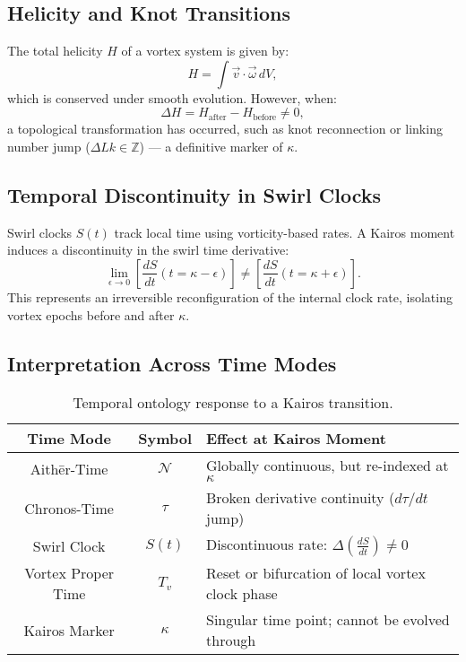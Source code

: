\documentclass[12pt]{article}
\begin{document}
    \subsection{Helicity and Knot Transitions}
    The total helicity \( H \) of a vortex system is given by:
    \begin{equation}
        H = \int \vec{v} \cdot \vec{\omega} \, dV,
    \end{equation}
    which is conserved under smooth evolution. However, when:
    \[
        \Delta H = H_{\text{after}} - H_{\text{before}} \neq 0,
    \]
    a topological transformation has occurred, such as knot reconnection or linking number jump (\( \Delta Lk \in \mathbb{Z} \)) — a definitive marker of \( \kappa \).

    \subsection{Temporal Discontinuity in Swirl Clocks}
    Swirl clocks \( S(t) \) track local time using vorticity-based rates. A Kairos moment induces a discontinuity in the swirl time derivative:
    \begin{equation}
        \lim_{\epsilon \to 0} \left[ \frac{dS}{dt}(t = \kappa - \epsilon) \right]
        \neq
        \left[ \frac{dS}{dt}(t = \kappa + \epsilon) \right].
    \end{equation}
    This represents an irreversible reconfiguration of the internal clock rate, isolating vortex epochs before and after \( \kappa \).

    \subsection{Interpretation Across Time Modes}

    \begin{table}[H]
        \centering
        \renewcommand{\arraystretch}{1.3}
        \begin{tabular}{|c|c|p{9cm}|}
            \hline
            \textbf{Time Mode} & \textbf{Symbol} & \textbf{Effect at Kairos Moment} \\
            \hline
            Aithēr-Time & \( \mathcal{N} \) & Globally continuous, but re-indexed at \(\kappa\) \\
            Chronos-Time & \( \tau \) & Broken derivative continuity (\( d\tau/dt \) jump) \\
            Swirl Clock & \( S(t) \) & Discontinuous rate: \( \Delta \left(\frac{dS}{dt}\right) \neq 0 \) \\
            Vortex Proper Time & \( T_v \) & Reset or bifurcation of local vortex clock phase \\
            Kairos Marker & \( \kappa \) & Singular time point; cannot be evolved through \\
            \hline
        \end{tabular}
        \caption{Temporal ontology response to a Kairos transition.}
    \end{table}
\end{document}

